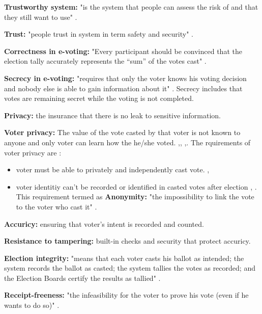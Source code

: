 \textbf{Trustworthy system:} "is the system that people can assess the risk of and that they still want to use" \cite{S1}.


\textbf{Trust:} "people trust in system in term safety and security" \cite{S1}.




\textbf{Correctness in e-voting:} "Every participant should be convinced that the election tally accurately represents
the “sum” of the votes cast" \cite{S9}.




\textbf{Secrecy in e-voting:} "requires that only the voter knows his voting decision and nobody else is able to gain information about it" \cite{S5}.
Secrecy includes that votes are remaining secret while the voting is not completed.
 
\textbf{Privacy:} the insurance that there is no leak to sensitive information.


\textbf{Voter privacy:} The value of the vote casted by that voter is not known to anyone and only voter can learn how the he/she  voted. \cite{S2},\cite{S3}, \cite{S8},\cite{S9}. The rquirements of voter privacy are :
\begin{itemize}
\item voter must be able to privately and independently cast vote. \cite{Ansari:2008},
\item voter identitiy can't be recorded or identified in casted votes after election \cite{S5}, \cite{Ansari:2008}. This requirement termed as \textbf{Anonymity:} "the impossibility to link the vote  to the voter who cast it" \cite{S5}.

\end{itemize}

\textbf{Accuricy:} ensuring  that voter's intent is recorded and counted.\cite{RepMonroe:2009}


\textbf{Resistance to tampering:} built-in checks and security that protect accuricy.\cite{RepMonroe:2009}
  






\textbf{Election integrity:} "means that each voter casts his ballot as intended; the system records the ballot as casted; the system tallies the votes as recorded; and the Election Boards certify the results as tallied" \cite{S3}.


\textbf{Receipt-freeness:} "the infeasibility for the voter to prove his vote (even if he wants to do so)" \cite{S5}.


